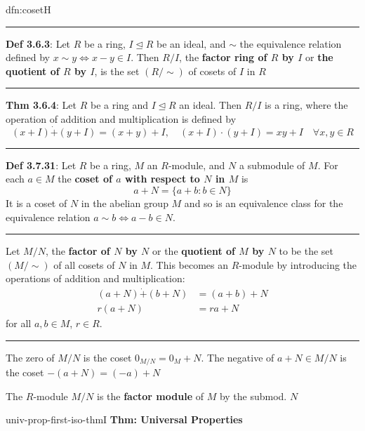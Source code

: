 \documentclass[landscape, 8pt]{extarticle}
\begin{document}
\begin{multicols}{3}
\begin{dfn}[Coset]{dfn:coset}{H}
    \noindent\rule{\textwidth}{0.2pt}
    \textbf{Def 3.6.3}: Let $R$ be a ring, $I \unlhd R$ be an ideal, and $\sim$ the equivalence relation defined by $x \sim y \iff x - y \in I$. Then $R / I$, the \textbf{factor ring of $R$ by $I$} or \textbf{the quotient of $R$ by $I$}, is the set $(R / \sim)$ of cosets of $I$ in $R$

    \noindent\rule{\textwidth}{0.2pt}
    \textbf{Thm 3.6.4}: Let $R$ be a ring and $I \unlhd R$ an ideal. Then $R / I$ is a ring, where the operation of addition and multiplication is defined by
    \[(x + I) \dot{+} (y + I) = (x + y) + I, \quad (x + I) \cdot (y + I) = xy + I \quad \forall x,y\in R\]

    \vspace{-5pt}
    \noindent\rule{\textwidth}{0.6pt}

    \textbf{Def 3.7.31}: Let $R$ be a ring, $M$ an $R$-module, and $N$ a submodule of $M$. For each $a\in M$ the \textbf{coset of $a$ with respect to $N$ in $M$} is
    \[a + N = \{ a + b : b\in N\}\]
    It is a coset of $N$ in the abelian group $M$ and so is an equivalence class for the equivalence relation $a \sim b \iff a - b \in N$.

    \vspace{-5pt}
    \noindent\rule{\textwidth}{0.2pt}
    Let $M / N$, the \textbf{factor of $N$ by $N$} or the \textbf{quotient of $M$ by $N$} to be the set $(M / \sim)$ of all cosets of $N$ in $M$. This becomes an $R$-module by introducing the operations of addition and multiplication:
    \begin{align*}
        (a + N) \dot{+} (b + N) &= (a + b) + N\\
        r(a + N) &= ra + N
    \end{align*}
    for all $a,b\in M$, $r\in R$.

    \vspace{-5pt}
    \noindent\rule{\textwidth}{0.2pt}
    The zero of $M / N$ is the coset $0_{M /N} = 0_{M} + N$. The negative of $a + N\in M / N$ is the coset $-(a + N) = (-a) + N$

    The $R$-module $M / N$ is the \textbf{factor module} of $M$ by the submod. $N$
\end{dfn}

\vspace{-5pt}
\begin{thm}{univ-prop-first-iso-thm}{I}
    \vspace{-5pt}
    \textbf{Thm: Universal Properties}


\end{thm}
\end{multicols}
\end{document}
